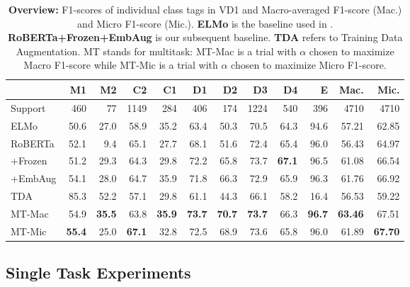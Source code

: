 \documentclass[11pt]{article}
\newcommand\nd{VD1\xspace}
\begin{document}
\begin{table*}[t]
    \centering
    \begin{tabular}{|l||r|r|r|r|r|r|r|r|r||r|r|}
\hline
{} &     M1 &     M2 &     C2 &     C1 &     D1 &     D2 &     D3 &     D4 &      E &  Mac. &  Mic. \\
\hline
Support &  460 &  77 &  1149 &  284 &  406 &  174 &  1224 &  540 &  396 &   4710 &      4710 \\
\hline
\hline
ELMo    &  50.6 &  27.0 &  58.9 &  35.2 &  63.4 &  50.3 &  70.5 &  64.3 &  94.6 &  57.21 &     62.85 \\
\hline
RoBERTa &  52.1 &  9.4  &  65.1 &  27.7 &  68.1 &  51.6 &  72.4 &  65.4 &  96.0 &  56.43 &     64.97 \\
+Frozen &  51.2 &  29.3 &  64.3 &  29.8 &  72.2 &  65.8 &  73.7 &  \textbf{67.1} &  96.5 &  61.08 &     66.54 \\
+EmbAug &  54.1 &  28.0 &  64.7 &  35.9 &  71.8 &  66.3 &  72.9 &  65.9 &  96.3 &  61.76 &     66.92 \\
\hline 
\hline
TDA     &  85.3 &  52.2 &  57.1 &  29.8 &  61.1 &  44.3 &  66.1 &  58.2 &  16.4 &  56.53 &     59.22 \\
\hline 
\hline 
MT-Mac  &  54.9 &  \textbf{35.5} &  63.8 &  \textbf{35.9} &  \textbf{73.7} &  \textbf{70.7} &  \textbf{73.7} &  66.3 &  \textbf{96.7} & \textbf{63.46} &     67.51 \\
MT-Mic  &  \textbf{55.4} &  25.0 & \textbf{67.1} &  32.8 &  72.5 &  68.9 &  73.6 &  65.8 &  96.0 &  61.89 &      \textbf{67.70} \\
\hline
\end{tabular}
    \caption{\textbf{Overview:} F1-scores of individual class tags in \nd and Macro-averaged F1-score (Mac.) and Micro F1-score (Mic.). \textbf{ELMo} is the baseline used in \cite{choubey-etal-2020-discourse}. \textbf{RoBERTa+Frozen+EmbAug} is our subsequent baseline. \textbf{TDA} refers to Training Data Augmentation. MT stands for multitask: MT-Mac is a trial with $\alpha$ chosen to maximize Macro F1-score while MT-Mic is a trial with $\alpha$ chosen to maximize Micro F1-score.}
    \label{tab:positive_results}
\end{table*}

\subsection{Single Task Experiments}

\end{document}

